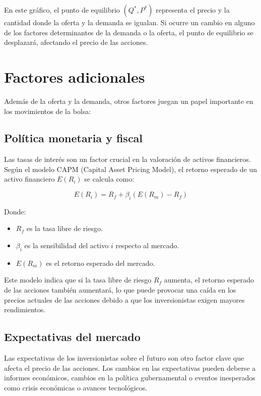 En este gráfico, el punto de equilibrio $(Q^*, P^*)$ representa el precio y la cantidad donde la oferta y la demanda se igualan. Si ocurre un cambio en alguno de los factores determinantes de la demanda o la oferta, el punto de equilibrio se desplazará, afectando el precio de las acciones.

\section{Factores adicionales}

Además de la oferta y la demanda, otros factores juegan un papel importante en los movimientos de la bolsa:

\subsection{Política monetaria y fiscal}
Las tasas de interés son un factor crucial en la valoración de activos financieros. Según el modelo CAPM (Capital Asset Pricing Model), el retorno esperado de un activo financiero $E(R_i)$ se calcula como:

\begin{equation}
E(R_i) = R_f + \beta_i (E(R_m) - R_f)
\end{equation}

Donde:
\begin{itemize}
\item $R_f$ es la tasa libre de riesgo.
\item $\beta_i$ es la sensibilidad del activo $i$ respecto al mercado.
\item $E(R_m)$ es el retorno esperado del mercado.
\end{itemize}

Este modelo indica que si la tasa libre de riesgo \(R_f\) aumenta, el retorno esperado de las acciones también aumentará, lo que puede provocar una caída en los precios actuales de las acciones debido a que los inversionistas exigen mayores rendimientos.

\subsection{Expectativas del mercado}

Las expectativas de los inversionistas sobre el futuro son otro factor clave que afecta el precio de las acciones. Los cambios en las expectativas pueden deberse a informes económicos, cambios en la política gubernamental o eventos inesperados como crisis económicas o avances tecnológicos.


